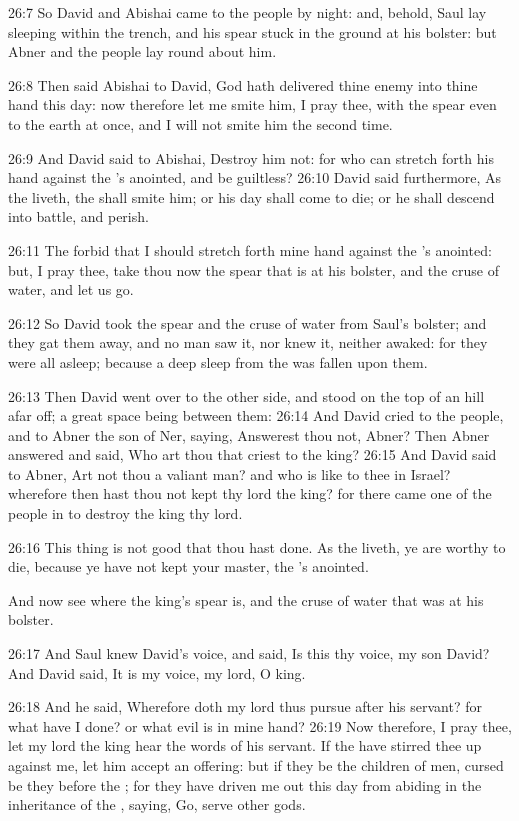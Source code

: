 26:7 So David and Abishai came to the people by night: and, behold, Saul lay sleeping within the trench, and his spear stuck in the ground at his bolster: but Abner and the people lay round about him.

26:8 Then said Abishai to David, God hath delivered thine enemy into thine hand this day: now therefore let me smite him, I pray thee, with the spear even to the earth at once, and I will not smite him the second time.

26:9 And David said to Abishai, Destroy him not: for who can stretch forth his hand against the \LORD's anointed, and be guiltless?  26:10 David said furthermore, As the \LORD liveth, the \LORD shall smite him; or his day shall come to die; or he shall descend into battle, and perish.

26:11 The \LORD forbid that I should stretch forth mine hand against the \LORD's anointed: but, I pray thee, take thou now the spear that is at his bolster, and the cruse of water, and let us go.

26:12 So David took the spear and the cruse of water from Saul's bolster; and they gat them away, and no man saw it, nor knew it, neither awaked: for they were all asleep; because a deep sleep from the \LORD was fallen upon them.

26:13 Then David went over to the other side, and stood on the top of an hill afar off; a great space being between them: 26:14 And David cried to the people, and to Abner the son of Ner, saying, Answerest thou not, Abner? Then Abner answered and said, Who art thou that criest to the king?  26:15 And David said to Abner, Art not thou a valiant man? and who is like to thee in Israel? wherefore then hast thou not kept thy lord the king? for there came one of the people in to destroy the king thy lord.

26:16 This thing is not good that thou hast done. As the \LORD liveth, ye are worthy to die, because ye have not kept your master, the \LORD's anointed.

And now see where the king's spear is, and the cruse of water that was at his bolster.

26:17 And Saul knew David's voice, and said, Is this thy voice, my son David? And David said, It is my voice, my lord, O king.

26:18 And he said, Wherefore doth my lord thus pursue after his servant?  for what have I done? or what evil is in mine hand?  26:19 Now therefore, I pray thee, let my lord the king hear the words of his servant. If the \LORD have stirred thee up against me, let him accept an offering: but if they be the children of men, cursed be they before the \LORD; for they have driven me out this day from abiding in the inheritance of the \LORD, saying, Go, serve other gods.

